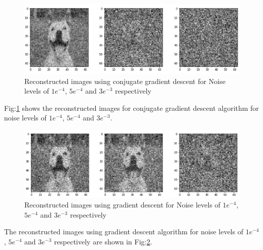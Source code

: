 \documentclass[conference]{IEEEtran}
\begin{document}
\begin{itemize}
     \begin{figure}[ht]
        \centering
        \includegraphics[scale=0.55]{figures/cgd_noise_influence.jpg}
        \caption{Reconstructed images using conjugate gradient descent for Noise levels of \(1{e}^{-4}\), \(5{e}^{-4}\) and \(3{e}^{-3}\) respectively}
        \label{fig:cgd_noise_influence}
        \end{figure}
    \par Fig:\ref{fig:cgd_noise_influence} shows the reconstructed images for conjugate gradient descent algorithm for noise levels of \(1{e}^{-4}\), \(5{e}^{-4}\) and \(3{e}^{-3}\).
    
    \begin{figure}[ht]
        \centering
        \includegraphics[scale=0.55]{figures/gd_noise_influence.jpg}
        \caption{Reconstructed images using gradient descent for Noise levels of \(1{e}^{-4}\), \(5{e}^{-4}\) and \(3{e}^{-3}\) respectively}
        \label{fig:gd_noise_influence}
        \end{figure}
    \par The reconstructed images using gradient descent algorithm for noise levels of \(1{e}^{-4}\), \(5{e}^{-4}\) and \(3{e}^{-3}\) respectively are shown in Fig:\ref{fig:gd_noise_influence}.
    

\end{itemize}
\end{document}
